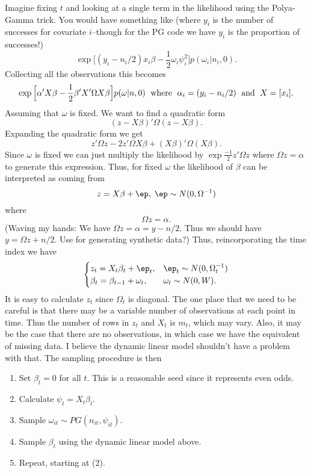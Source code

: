 \documentclass{article}
\begin{document}
Imagine fixing $t$ and looking at a single term in the likelihood using the
Polya-Gamma trick.  You would have something like (where $y_i$ is the number of
successes for covariate $i$--though for the PG code we have $y_i$ is the
proportion of successes!)
\[
\exp \Big[ (y_{i} - n_{i}/2) x_{i} \beta - \frac{1}{2} \omega_{i} \psi_i^2
\Big] 
p(\omega_i | n_i, 0). 
\]
Collecting all the observations this becomes
\[
\exp \Big[ \alpha' X \beta - \frac{1}{2} \beta' X' \Omega X \beta \Big]
p(\omega | n, 0) \;
\textmd{ where } \;
\alpha_i = (y_i - n_i/2) \; \textmd{ and } \; X = [x_i].
\]
Assuming that $\omega$ is fixed.  We want to find a quadratic form
\[
(z - X \beta)' \Omega (z - X \beta).
\]
Expanding the quadratic form we get
\[
z' \Omega z - 2 z' \Omega X \beta + (X \beta)' \Omega (X \beta).
\]
Since $\omega$ is fixed we can just multiply the likelihood by $\exp
\frac{-1}{2} z' \Omega z$ where $\Omega z = \alpha$ to generate this expression.
Thus, for fixed $\omega$ the likelihood of $\beta$ can be interpreted as coming from
\[
z = X \beta + \ep, \; \ep \sim N(0, \Omega^{-1})
\]
where
\[
\Omega z = \alpha.
\]
(Waving my hands: We have $\Omega z = \alpha = y - n/2$.  Thus we should
have $y = \Omega z + n/2$.  Use for generating synthetic data?)  Thus,
reincorporating the time index we have
\[
\begin{cases}
z_t = X_t \beta_t + \ep_t, & \ep_t \sim N(0, \Omega_t^{-1}) \\
\beta_t = \beta_{t-1} + \omega_t, & \omega_t \sim N(0, W).
\end{cases}
\]
It is easy to calculate $z_t$ since $\Omega_t$ is diagonal.  The one place that
we need to be careful is that there may be a variable number of observations at
each point in time.  Thus the number of rows in $z_t$ and $X_t$ is $m_t$, which
may vary.  Also, it may be the case that there are no observations, in which
case we have the equivalent of missing data.  I believe the dynamic linear model
shouldn't have a problem with that.  The sampling procedure is then
\begin{enumerate}
\item Set $\beta_t = 0$ for all $t$.  This is a reasonable seed since it
  represents even odds.
\item Calculate $\psi_t = X_t \beta_t$.
\item Sample $\omega_{it} \sim PG(n_{it}, \psi_{it})$.
\item Sample $\beta_t$ using the dynamic linear model above.
\item Repeat, starting at (2).
\end{enumerate}
\end{document}
